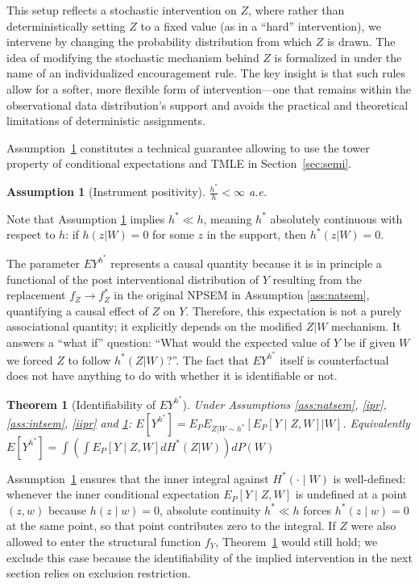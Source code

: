 \documentclass[12pt]{article}
\theoremstyle{thmstyleone}%
\newtheorem{theo}{Theorem}%
\theoremstyle{thmstyletwo}%
\theoremstyle{thmstylethree}%
\newtheorem{assumption}{Assumption}
\begin{document}
This setup reflects a stochastic intervention on $Z$, where rather than deterministically setting $Z$ to a fixed value (as in a ``hard'' intervention), we intervene by changing the probability distribution from which $Z$ is drawn. The idea of modifying the stochastic mechanism behind $Z$ is formalized in \citep{Qiu02012021} under the name of an individualized encouragement rule. The key insight is that such rules allow for a softer, more flexible form of intervention---one that remains within the observational data distribution's support and avoids the practical and theoretical limitations of deterministic assignments. 

Assumption~\ref{wp}  {constitutes} a technical guarantee allowing to use the tower property of conditional expectations and TMLE in Section~\ref{sec:semi}.

\begin{assumption}[Instrument positivity]\label{wp} $\frac{h^*}{h} <\infty$ a.e.
\end{assumption}

Note that Assumption \ref{wp} implies $h^* \ll h$, meaning $h^*$ absolutely continuous with respect to $h$: if $h(z|W)=0$ for some $z$ in the support, then $h^* (z|W)=0$. 



The parameter $EY^{h^*}$ represents a causal quantity because it is in principle a functional of the post interventional distribution of $Y$ resulting from the replacement $f_Z \to f^*_Z$ in the original NPSEM in Assumption \ref{ass:natsem}, quantifying a causal effect of $Z$ on $Y$. Therefore, this expectation is not a purely associational quantity; it explicitly depends on the modified $Z|W$ mechanism. It answers a ``what if'' question: ``What would the expected value of $Y$ be if given $W$ we forced $Z$ to follow $h^*(Z|W)$?''. The fact that $EY^{h^*}$  itself is counterfactual does not have anything to do with whether it is identifiable or not. 

\begin{theo}[Identifiability of $EY^{h^*}$]\label{idth}
Under Assumptions \ref{ass:natsem}, \ref{ipr}, \ref{ass:intsem}, \ref{iipr} and \ref{wp}: $E[Y^{h^*}] = E_P E_{Z | W \sim h^*} \left[ E_P[Y \mid Z, W] |W \right]$. Equivalently $E[Y^{h^*}] = \int \left( \int  E_P[Y \mid Z, W] dH^*(Z|W)\right)dP(W)$
\end{theo}
 {Assumption~\ref{wp} ensures that the inner integral against $H^*(\cdot\mid W)$ is well-defined: whenever the inner conditional expectation $E_P[Y\mid Z,W]$ is undefined at a point $(z,w)$ because $h(z\mid w)=0$, absolute continuity $h^*\ll h$ forces $h^*(z\mid w)=0$ at the same point, so that point contributes zero to the integral. If $Z$ were also allowed to enter the structural function $f_Y$, Theorem~\ref{idth} would still hold; we exclude this case because the identifiability of the implied intervention in the next section relies on exclusion restriction.}
\end{document}
